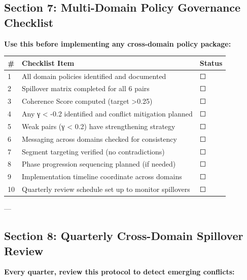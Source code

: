 \subsection*{Section 7: Multi-Domain Policy Governance Checklist}

\textbf{Use this before implementing any cross-domain policy package:}

\begin{center}
\small
\begin{tabular}{@{}p{1cm}p{8cm}p{1.5cm}@{}}
\toprule
\textbf{\#} & \textbf{Checklist Item} & \textbf{Status} \\
\midrule
1 & All domain policies identified and documented & ☐ \\
2 & Spillover matrix completed for all 6 pairs & ☐ \\
3 & Coherence Score computed (target >0.25) & ☐ \\
4 & Any γ < -0.2 identified and conflict mitigation planned & ☐ \\
5 & Weak pairs (γ < 0.2) have strengthening strategy & ☐ \\
6 & Messaging across domains checked for consistency & ☐ \\
7 & Segment targeting verified (no contradictions) & ☐ \\
8 & Phase progression sequencing planned (if needed) & ☐ \\
9 & Implementation timeline coordinate across domains & ☐ \\
10 & Quarterly review schedule set up to monitor spillovers & ☐ \\
\midrule
\end{tabular}
\end{center}

---


\subsection*{Section 8: Quarterly Cross-Domain Spillover Review}

\textbf{Every quarter, review this protocol to detect emerging conflicts:}

